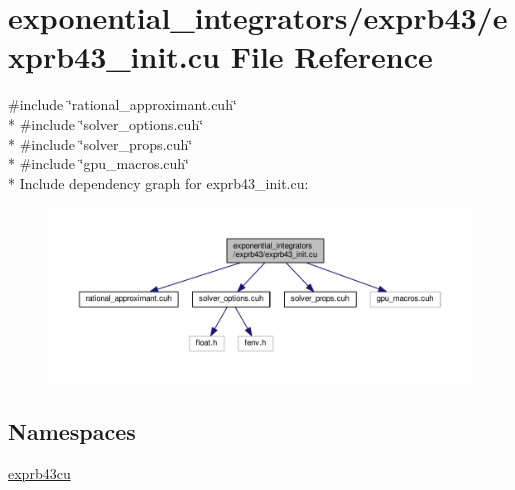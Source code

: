\hypertarget{exprb43__init_8cu}{}\section{exponential\+\_\+integrators/exprb43/exprb43\+\_\+init.cu File Reference}
\label{exprb43__init_8cu}
{\ttfamily \#include \char`\"{}rational\+\_\+approximant.\+cuh\char`\"{}}\\*
{\ttfamily \#include \char`\"{}solver\+\_\+options.\+cuh\char`\"{}}\\*
{\ttfamily \#include \char`\"{}solver\+\_\+props.\+cuh\char`\"{}}\\*
{\ttfamily \#include \char`\"{}gpu\+\_\+macros.\+cuh\char`\"{}}\\*
Include dependency graph for exprb43\+\_\+init.\+cu\+:\nopagebreak
\begin{figure}[H]
\begin{center}
\leavevmode
\includegraphics[width=350pt]{exprb43__init_8cu__incl}
\end{center}
\end{figure}
\subsection*{Namespaces}
\begin{DoxyCompactItemize}
\item 
 \hyperlink{namespaceexprb43cu}{exprb43cu}
\end{DoxyCompactItemize}
